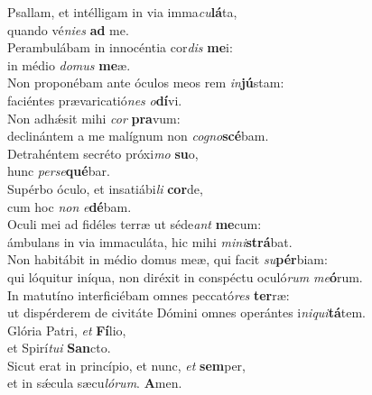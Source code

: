 \evenverse Psallam, et intélligam in via imma\textit{cu}\textbf{lá}ta,~\*\\
\evenverse quando vé\textit{ni}\textit{es} \textbf{ad} me.\\
\oddverse Perambulábam in innocéntia cor\textit{dis} \textbf{me}i:~\*\\
\oddverse in médio \textit{do}\textit{mus} \textbf{me}æ.\\
\evenverse Non proponébam ante óculos meos rem \textit{in}\textbf{jú}stam:~\*\\
\evenverse faciéntes prævaricatió\textit{nes} \textit{o}\textbf{dí}vi.\\
\oddverse Non adhǽsit mihi \textit{cor} \textbf{pra}vum:~\*\\
\oddverse declinántem a me malígnum non \textit{co}\textit{gno}\textbf{scé}bam.\\
\evenverse Detrahéntem secréto próxi\textit{mo} \textbf{su}o,~\*\\
\evenverse hunc \textit{per}\textit{se}\textbf{qué}bar.\\
\oddverse Supérbo óculo, et insatiábi\textit{li} \textbf{cor}de,~\*\\
\oddverse cum hoc \textit{non} \textit{e}\textbf{dé}bam.\\
\evenverse Oculi mei ad fidéles terræ ut séde\textit{ant} \textbf{me}cum:~\*\\
\evenverse ámbulans in via immaculáta, hic mihi \textit{mi}\textit{ni}\textbf{strá}bat.\\
\oddverse Non habitábit in médio domus meæ, qui facit \textit{su}\textbf{pér}biam:~\*\\
\oddverse qui lóquitur iníqua, non diréxit in conspéctu oculó\textit{rum} \textit{me}\textbf{ó}rum.\\
\evenverse In matutíno interficiébam omnes peccató\textit{res} \textbf{ter}ræ:~\*\\
\evenverse ut dispérderem de civitáte Dómini omnes operántes i\textit{ni}\textit{qui}\textbf{tá}tem.\\
\oddverse Glória Patri, \textit{et} \textbf{Fí}lio,~\*\\
\oddverse et Spirí\textit{tu}\textit{i} \textbf{San}cto.\\
\evenverse Sicut erat in princípio, et nunc, \textit{et} \textbf{sem}per,~\*\\
\evenverse et in sǽcula sæcu\textit{ló}\textit{rum}. \textbf{A}men.\\
